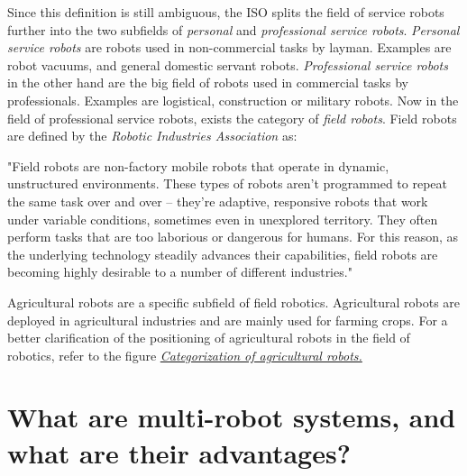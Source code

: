         Since this definition is still ambiguous, the ISO splits the field of service robots further into the two subfields of \emph{personal} and \emph{professional service robots}. \emph{Personal service robots} are robots used in non-commercial tasks by layman. Examples are robot vacuums, and general domestic servant robots. \emph{Professional service robots} in the other hand are the big field of robots used in commercial tasks by professionals. Examples are logistical, construction or military robots.
        Now in the field of professional service robots, exists the category of \emph{field robots}. Field robots are defined by the \emph{Robotic Industries Association} as:
        \begin{displayquote}
            "Field robots are non-factory mobile robots that operate in dynamic, unstructured environments. These types of robots aren’t programmed to repeat the same task over and over – they’re adaptive, responsive robots that work under variable conditions, sometimes even in unexplored territory. They often perform tasks that are too laborious or dangerous for humans. For this reason, as the underlying technology steadily advances their capabilities, field robots are becoming highly desirable to a number of different industries."
        \end{displayquote}

        Agricultural robots are a specific subfield of field robotics. Agricultural robots are deployed in agricultural industries and are mainly used for farming crops. For a better clarification of the positioning of agricultural robots in the field of robotics, refer to the figure \hyperlink{fig:category_mindmap}{\emph{Categorization of agricultural robots.}}

        \section{What are multi-robot systems, and what are their advantages?}

